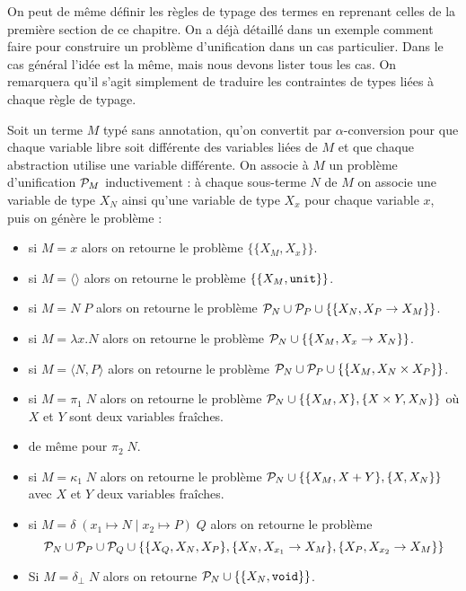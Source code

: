 On peut de même définir les règles de typage des termes en reprenant celles de la première section de ce chapitre. On a déjà détaillé dans un exemple comment faire pour construire un problème d'unification dans un cas particulier. Dans le cas général l'idée est la même, mais nous devons lister tous les cas. On remarquera qu'il s'agit simplement de traduire les contraintes de types liées à chaque règle de typage.

\begin{defi}
    Soit un terme $M$ typé sans annotation, qu'on convertit par $\alpha$-conversion pour que chaque variable libre soit différente des variables liées de $M$ et que chaque abstraction utilise une variable différente. On associe à $M$ un problème d'unification $\mathcal P_M$ inductivement : à chaque sous-terme $N$ de $M$ on associe une variable de type $X_N$ ainsi qu'une variable de type $X_x$ pour chaque variable $x$, puis on génère le problème :
    \begin{itemize}[label=$\bullet$]
        \item si $M = x$ alors on retourne le problème $\{\{X_M,X_x\}\}$.
        \item si $M = \langle\rangle$ alors on retourne le problème $\{\{X_M,\texttt{unit}\}\}$.
        \item si $M = N\;P$ alors on retourne le problème $\mathcal P_N\cup\mathcal P_P\cup\{\{X_N,X_P\to X_M\}\}$.
        \item si $M = \lambda x.N$ alors on retourne le problème $\mathcal P_N\cup\{\{X_M,X_x\to X_N\}\}$.
        \item si $M = \langle N,P\rangle$ alors on retourne le problème $\mathcal P_N\cup\mathcal P_P\cup\{\{X_M,X_N\times X_P\}\}$.
        \item si $M = \pi_1\;N$ alors on retourne le problème $\mathcal P_N\cup\{\{X_M,X\},\{X\times Y,X_N\}\}$ où $X$ et $Y$ sont deux variables fraîches.
        \item de même pour $\pi_2\;N$.
        \item si $M = \kappa_1\;N$ alors on retourne le problème $\mathcal P_N\cup \{\{X_M,X+Y\},\{X,X_N\}\}$ avec $X$ et $Y$ deux variables fraîches.
        \item si $M = \delta\;(x_1\mapsto N\mid x_2\mapsto P)\;Q$ alors on retourne le problème $$\mathcal P_N\cup\mathcal P_P\cup\mathcal P_Q\cup\{\{X_Q,X_N,X_P\},\{X_N,X_{x_1}\to X_M\},\{X_P,X_{x_2}\to X_M\}\}$$
        \item Si $M = \delta_\bot\;N$ alors on retourne $\mathcal P_N\cup\{\{X_N,\texttt{void}\}\}$.
    \end{itemize}
\end{defi}

